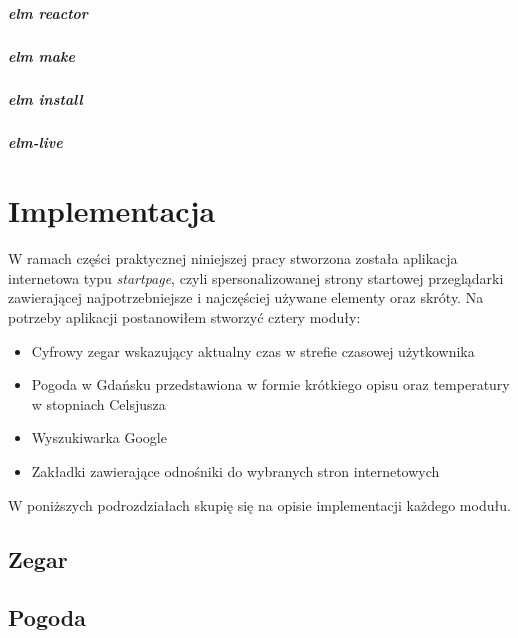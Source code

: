 \documentclass[twoside,a4paper]{report}
\begin{document}
\paragraph{elm reactor}

\paragraph{elm make}

\paragraph{elm install}

\paragraph{elm-live}\cite{elm-live}



\chapter{Implementacja}
W ramach części praktycznej niniejszej pracy stworzona została aplikacja internetowa typu \textit{startpage}, czyli spersonalizowanej strony startowej przeglądarki zawierającej najpotrzebniejsze i najczęściej używane elementy oraz skróty.
Na potrzeby aplikacji postanowiłem stworzyć cztery moduły:
\begin{itemize}
    \item Cyfrowy zegar wskazujący aktualny czas w strefie czasowej użytkownika
    \item Pogoda w Gdańsku przedstawiona w formie krótkiego opisu oraz temperatury w stopniach Celsjusza
    \item Wyszukiwarka Google
    \item Zakładki zawierające odnośniki do wybranych stron internetowych
\end{itemize}

W poniższych podrozdziałach skupię się na opisie implementacji każdego modułu.

\section{Zegar}

\section{Pogoda}
\end{document}
